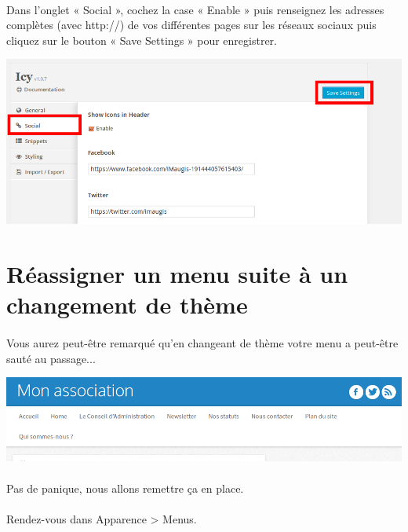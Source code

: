 \documentclass[10pt,a4paper]{article}
\begin{document}
\paragraph{}Dans l'onglet « Social », cochez la case « Enable » puis renseignez les adresses complètes (avec http://) de vos différentes pages sur les réseaux sociaux puis cliquez sur le bouton « Save Settings » pour enregistrer.
\begin{center}
\includegraphics[scale=0.3]{img/0248.png}
\end{center}
\newpage
\section{Réassigner un menu suite à un changement de thème}
\paragraph{}Vous aurez peut-être remarqué qu'en changeant de thème votre menu a peut-être sauté au passage...
\begin{center}
\includegraphics[scale=0.3]{img/0249.png}
\end{center}
\paragraph{}Pas de panique, nous allons remettre ça en place.
\paragraph{}Rendez-vous dans Apparence > Menus.
\end{document}

